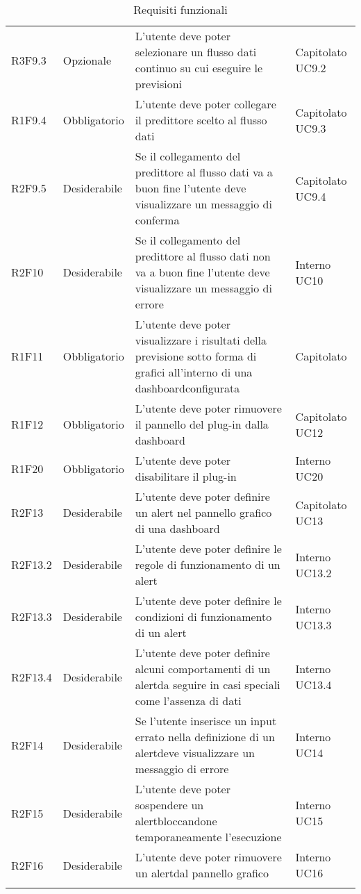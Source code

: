 \begin{longtable} {
		>{}p{24mm} 
		>{}p{32mm}
		>{}p{40mm} 
		>{}p{24.5mm}
		}
		R3F9.3 & Opzionale & L'utente deve poter selezionare un flusso dati continuo su cui eseguire le previsioni & Capitolato UC9.2 \TBstrut \\ [2mm]
		R1F9.4 & Obbligatorio & L'utente deve poter collegare il predittore scelto al flusso dati & Capitolato UC9.3 \TBstrut \\ [2mm]
		R2F9.5 & Desiderabile & Se il collegamento del predittore al flusso dati va a buon fine l'utente deve visualizzare un messaggio di conferma & Capitolato UC9.4 \TBstrut \\ [2mm]
		R2F10 & Desiderabile & Se il collegamento del predittore al flusso dati non va a buon fine l'utente deve visualizzare un messaggio di errore & Interno UC10 \TBstrut \\ [2mm]
		R1F11 & Obbligatorio & L'utente deve poter visualizzare i risultati della previsione sotto forma di grafici all'interno di una dashboard\glosp configurata & Capitolato \TBstrut \\ [2mm]
		R1F12 & Obbligatorio & L'utente deve poter rimuovere il pannello del plug-in dalla dashboard\glo & Capitolato UC12 \TBstrut \\ [2mm]	
		R1F20 & Obbligatorio & L'utente deve poter disabilitare il plug-in & Interno UC20 \TBstrut \\ [2mm]	
		R2F13 &	Desiderabile & L'utente deve poter definire un alert nel pannello grafico di una dashboard\glo & Capitolato UC13 \TBstrut \\ [2mm]					
		R2F13.2 & Desiderabile & L'utente deve poter definire le regole di funzionamento di un alert\glo & Interno UC13.2 \TBstrut \\ [2mm]		
		R2F13.3 & Desiderabile & L'utente deve poter definire le condizioni di funzionamento di un alert\glo & Interno UC13.3 \TBstrut \\ [2mm]
		R2F13.4 & Desiderabile & L'utente deve poter definire alcuni comportamenti di un alert\glosp da seguire in casi speciali come l'assenza di dati & Interno UC13.4 \TBstrut \\ [2mm]		
		R2F14 &	Desiderabile & Se l'utente inserisce un input errato nella definizione di un alert\glosp deve visualizzare un messaggio di errore & Interno UC14 \TBstrut \\ [2mm]
		R2F15 &	Desiderabile & L'utente deve poter sospendere un alert\glosp bloccandone temporaneamente l'esecuzione & Interno UC15 \TBstrut \\ [2mm]		
		R2F16 & Desiderabile & L'utente deve poter rimuovere un alert\glosp dal pannello grafico & Interno UC16 \TBstrut \\ [2mm]	
		\rowcolor{white}
		\caption{Requisiti funzionali}
	\end{longtable}
